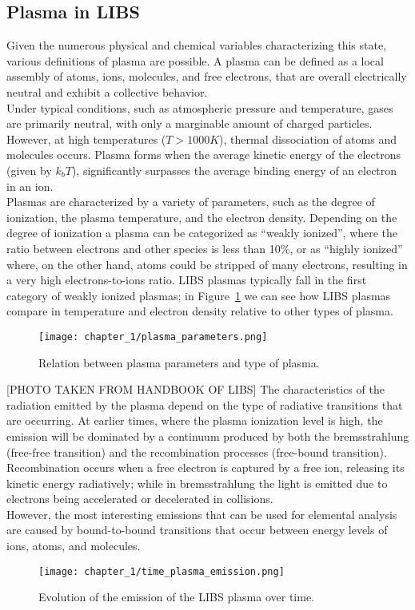 \subsection{Plasma in LIBS}
\label{subsec:plasma_in_libs}
Given the numerous physical and chemical variables characterizing this state, various definitions of plasma are possible. A plasma can be defined as a local assembly of atoms, ions, molecules, and free electrons, that are overall electrically neutral and exhibit a collective behavior.
\\
Under typical conditions, such as atmospheric pressure and temperature, gases are primarily neutral, with only a marginable amount of charged particles. However, at high temperatures ($T > 1000K$), thermal dissociation of atoms and molecules occurs. Plasma forms when the average kinetic energy of the electrons (given by $k_bT$), significantly surpasses the average binding energy of an electron in an ion.
\\
Plasmas are characterized by a variety of parameters, such as the degree of ionization, the plasma temperature, and the electron density. Depending on the degree of ionization a plasma can be categorized as “weakly ionized”, where the ratio between electrons and other species is less than 10\%, or as “highly ionized” where, on the other hand, atoms could be stripped of many electrons, resulting in a very high electrons-to-ions ratio. LIBS plasmas typically fall in the first category of weakly ionized plasmas; in Figure~\ref{fig:plasma_parameters} we can see how LIBS plasmas compare in temperature and electron density relative to other types of plasma.
\begin{figure}[H]
    \centering
    \texttt{[image: chapter\_1/plasma\_parameters.png]}
    \caption{Relation between plasma parameters and type of plasma.}
    \label{fig:plasma_parameters}
\end{figure}
[PHOTO TAKEN FROM HANDBOOK OF LIBS]
The characteristics of the radiation emitted by the plasma depend on the type of radiative transitions that are occurring. At earlier times, where the plasma ionization level is high, the emission will be dominated by a continuum produced by both the bremsstrahlung (free-free transition) and the recombination processes (free-bound transition). Recombination occurs when a free electron is captured by a free ion, releasing its kinetic energy radiatively; while in bremsstrahlung the light is emitted due to electrons being accelerated or decelerated in collisions.
\\
However, the most interesting emissions that can be used for elemental analysis are caused by bound-to-bound transitions that occur between energy levels of ions, atoms, and molecules. 
\begin{figure}[H]
    \centering
    \texttt{[image: chapter\_1/time\_plasma\_emission.png]}
    \caption{Evolution of the emission of the LIBS plasma over time.}
    \label{fig:time_plasma_emission}
\end{figure}

